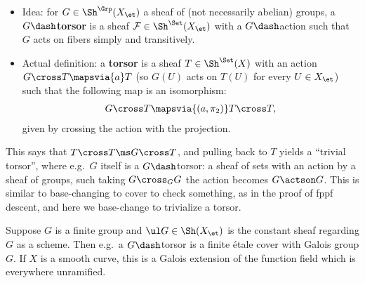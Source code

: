 \begin{definition}

\envlist

\begin{itemize}
\item
  Idea: for \(G\in\Sh^{\Grp}(X_\et)\) a sheaf of (not necessarily
  abelian) groups, a \textbf{\(G\dash\)torsor} is a sheaf
  \(\mathcal{F}\in \Sh^\Set(X_\et)\) with a \(G\dash\)action such that
  \(G\) acts on fibers simply and transitively.
\item
  Actual definition: a \textbf{torsor} is a sheaf \(T\in \Sh^\Set(X)\)
  with an action \(G\cross T \mapsvia{a} T\) (so \(G(U)\) acts on
  \(T(U)\) for every \(U\in X_\et\)) such that the following map is an
  isomorphism:
  \begin{align*}  
  G\cross T \mapsvia{(a, \pi_2)} T\cross T
  ,\end{align*} given by crossing the action with the projection.
\end{itemize}

\end{definition}

\begin{remark}

This says that \(T\cross T \ms G\cross T\), and pulling back to \(T\)
yields a ``trivial torsor'', where e.g.~\(G\) itself is a
\(G\dash\)torsor: a sheaf of sets with an action by a sheaf of groups,
such taking \(G\cross_G G\) the action becomes \(G\actson G\). This is
similar to base-changing to cover to check something, as in the proof of
fppf descent, and here we base-change to trivialize a torsor.

\end{remark}

\begin{example}[?]

Suppose \(G\) is a finite group and \(\ul G \in \Sh(X_\et)\) is the
constant sheaf regarding \(G\) as a scheme. Then e.g.~a \(G\dash\)torsor
is a finite étale cover with Galois group \(G\). If \(X\) is a smooth
curve, this is a Galois extension of the function field which is
everywhere unramified.

\end{example}

